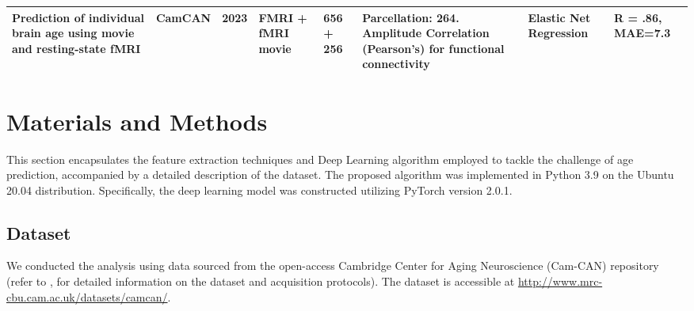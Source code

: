 \documentclass{cys}
\begin{document}
\begin{table}[]
{{\begin{tabular}{llllllll}
Prediction of individual brain age using movie and resting-state fMRI                                                                                                                          \cite{bi2024prediction} & CamCAN                                                                                                                                         & 2023          & FMRI + fMRI movie  & 656 + 256                                                                                                          & Parcellation: 264. Amplitude Correlation (Pearson’s) for functional connectivity                                                                                                                                                                                                                                                                                                                                                                                          & Elastic Net Regression                                                                                                                                                                          & R = .86, MAE=7.3                                                                                                                                                                    \\ \hline
\end{tabular}
}}
	\label{table:Table1}
\end{table}

\section{Materials and Methods}
\label{sec:Materials}

This section encapsulates the feature extraction techniques and Deep Learning algorithm employed to tackle the challenge of age prediction, accompanied by a detailed description of the dataset. The proposed algorithm was implemented in Python 3.9 on the Ubuntu 20.04 distribution. Specifically, the deep learning model was constructed utilizing PyTorch version 2.0.1.

\subsection{Dataset}
\label{subsec: Dataset}
We conducted the analysis using data sourced from the open-access Cambridge Center for Aging Neuroscience (Cam-CAN) repository (refer to \cite{shafto2014cambridge, taylor2017cambridge}, for detailed information on the dataset and acquisition protocols). The dataset is accessible at \url{http://www.mrc-cbu.cam.ac.uk/datasets/camcan/}.
\end{document}
